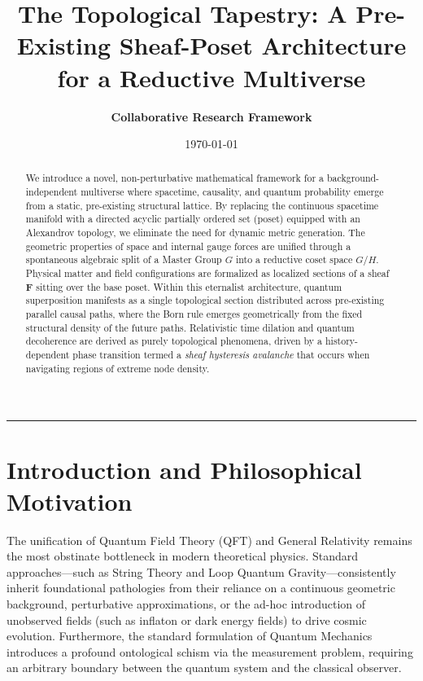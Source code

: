 \documentclass[12pt,letterpaper]{article}
\title{\textbf{The Topological Tapestry: A Pre-Existing Sheaf-Poset Architecture for a Reductive Multiverse}}
\author{\textbf{Collaborative Research Framework}}
\date{\today}
\begin{document}
\maketitle

\begin{abstract}
We introduce a novel, non-perturbative mathematical framework for a background-independent multiverse where spacetime, causality, and quantum probability emerge from a static, pre-existing structural lattice. By replacing the continuous spacetime manifold with a directed acyclic partially ordered set (poset) equipped with an Alexandrov topology, we eliminate the need for dynamic metric generation. The geometric properties of space and internal gauge forces are unified through a spontaneous algebraic split of a Master Group $G$ into a reductive coset space $G/H$. Physical matter and field configurations are formalized as localized sections of a sheaf $\mathbf{F}$ sitting over the base poset. Within this eternalist architecture, quantum superposition manifests as a single topological section distributed across pre-existing parallel causal paths, where the Born rule emerges geometrically from the fixed structural density of the future paths. Relativistic time dilation and quantum decoherence are derived as purely topological phenomena, driven by a history-dependent phase transition termed a \textit{sheaf hysteresis avalanche} that occurs when navigating regions of extreme node density.
\end{abstract}

\hrule
\vspace{0.5cm}

\section{Introduction and Philosophical Motivation}

The unification of Quantum Field Theory (QFT) and General Relativity remains the most obstinate bottleneck in modern theoretical physics. Standard approaches---such as String Theory and Loop Quantum Gravity---consistently inherit foundational pathologies from their reliance on a continuous geometric background, perturbative approximations, or the ad-hoc introduction of unobserved fields (such as inflaton or dark energy fields) to drive cosmic evolution. Furthermore, the standard formulation of Quantum Mechanics introduces a profound ontological schism via the measurement problem, requiring an arbitrary boundary between the quantum system and the classical observer.
\end{document}
